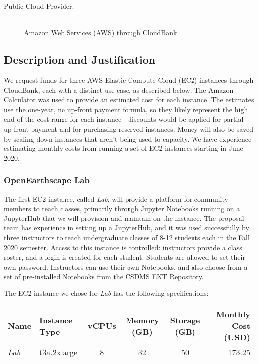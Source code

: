 \begin{description}
  \item[Public Cloud Provider:] \hfill \\ Amazon Web Services (AWS) through CloudBank
\end{description}


\subsection*{Description and Justification}

We request funds for three AWS Elastic Compute Cloud (EC2) instances through CloudBank, each with a distinct use case, as described below.
The Amazon Calculator was used to provide an estimated cost for each instance.
The estimates use the one-year, no up-front payment formula, so they likely represent the high end of the cost range for each instance---discounts would be applied for partial up-front payment and for purchasing reserved instances.
Money will also be saved by scaling down instances that aren't being used to capacity.
We have experience estimating monthly costs from running a set of EC2 instances starting in June 2020.

\subsubsection*{OpenEarthscape Lab}

The first EC2 instance, called \textit{Lab},
will provide a platform for community members to teach classes,
primarily through Jupyter Notebooks running on a JupyterHub
that we will provision and maintain on the instance.
The proposal team has experience in setting up a JupyterHub,
and it was used successfully by three instructors to teach undergraduate classes
of 8-12 students each in the Fall 2020 semester.
Access to this instance is controlled:
instructors provide a class roster,
and a login is created for each student.
Students are allowed to set their own password.
Instructors can use their own Notebooks,
and also choose from a set of pre-installed Notebooks
from the CSDMS EKT Repository.

The EC2 instance we chose for \textit{Lab} has the following specifications:

\begin{center}
\begin{tabular}{ |l|l|c|c|c|r| } 
 \hline
 Name & Instance Type & vCPUs & Memory (GB) & Storage (GB) & Monthly Cost (USD) \\ [0.5ex]
 \hline
 \textit{Lab} & t3a.2xlarge & 8 & 32 & 50 & 173.25 \\ 
 \hline
\end{tabular}
\end{center}

